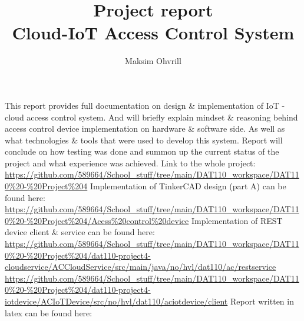 \documentclass[11pt]{article}
\begin{document}
\title{Project report \\Cloud-IoT Access Control System}

\author{Maksim Ohvrill}

\maketitle

\renewenvironment{abstract}
 {\small
  \begin{center}
  \bfseries \abstractname\vspace{-.5em}\vspace{0pt}
  \end{center}
  \list{}{%
    \setlength{\leftmargin}{20mm}%
    \setlength{\rightmargin}{\leftmargin}%
  }%
  \item\relax}
 {\endlist}

\begin{abstract}
This report provides full documentation on design \& implementation of
  IoT - cloud access control system. And will briefly explain mindset \& reasoning
  behind access control device implementation on hardware \& software side. As
  well as what technologies \& tools that were used to develop this system. Report
  will conclude on how testing was done and summon up the current status of the project 
  and what experience was achieved.
\newline\newline
Link to the whole project: \url{https://github.com/589664/School_stuff/tree/main/DAT110_workspace/DAT110%20-%20Project%204}
\newline\newline
Implementation of TinkerCAD design (part A) can be found here: \url{https://github.com/589664/School_stuff/tree/main/DAT110_workspace/DAT110%20-%20Project%204/Acess%20control%20device}
\newline\newline
Implementation of REST device client \& service can be found here: \url{https://github.com/589664/School_stuff/tree/main/DAT110_workspace/DAT110%20-%20Project%204/dat110-project4-cloudservice/ACCloudService/src/main/java/no/hvl/dat110/ac/restservice}
\newline
\url{https://github.com/589664/School_stuff/tree/main/DAT110_workspace/DAT110%20-%20Project%204/dat110-project4-iotdevice/ACIoTDevice/src/no/hvl/dat110/aciotdevice/client}
\newline\newline
Report written in latex can be found here:


\end{abstract}

%
















{}
\end{document}
